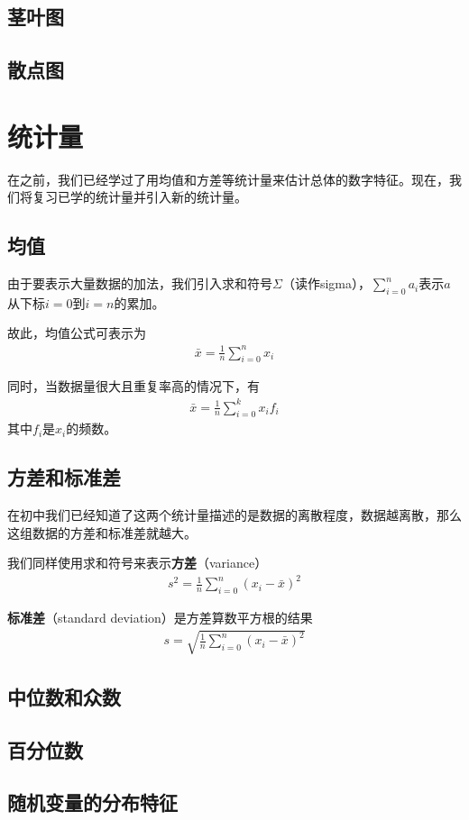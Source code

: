 \subsection{茎叶图}
\subsection{散点图}

\section{统计量}
在之前，我们已经学过了用均值和方差等统计量来估计总体的数字特征。现在，我们将复习已学的统计量并引入新的统计量。

\subsection{均值}
由于要表示大量数据的加法，我们引入求和符号$\Sigma$（读作sigma），${\displaystyle\sum_{i=0}^n a_i}$表示$a$从下标$i=0$到$i=n$的累加。

故此，均值公式可表示为
\begin{gather}
	\bar{x}=\frac{1}{n}\sum_{i=0}^n x_i \label{equ:mean-1}
\end{gather}

同时，当数据量很大且重复率高的情况下，有
\begin{gather}
	\bar{x}=\frac{1}{n}\sum_{i=0}^k x_if_i \label{equ:mean-2}
\end{gather}
其中$f_i$是$x_i$的频数。

\subsection{方差和标准差}
在初中我们已经知道了这两个统计量描述的是数据的离散程度，数据越离散，那么这组数据的方差和标准差就越大。

我们同样使用求和符号来表示\textbf{方差}（variance）
\begin{gather}
	s^2=\frac{1}{n}\sum_{i=0}^{n} (x_i-\bar{x})^2 \label{equ:variance}
\end{gather}

\textbf{标准差}（standard deviation）是方差算数平方根的结果
\begin{gather}
	s=\sqrt{\frac{1}{n}\sum_{i=0}^{n} (x_i-\bar{x})^2} \label{equ:standard-deviation}
\end{gather}

\subsection{中位数和众数}
\subsection{百分位数}
\subsection{随机变量的分布特征}
